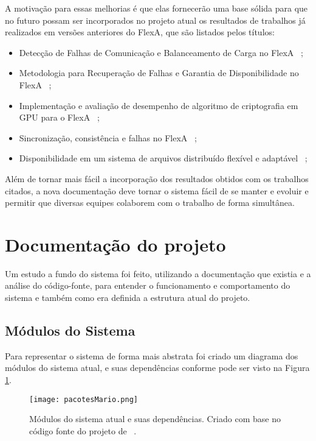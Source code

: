         A motivação para essas melhorias é que elas fornecerão uma base sólida para que no futuro possam ser incorporados no projeto atual os resultados de trabalhos já realizados em versões anteriores do FlexA, que são listados pelos títulos:
        
        \begin{itemize}
            \item Detecção de Falhas de Comunicação e Balanceamento de Carga no FlexA ~\cite{danilo};
            \item Metodologia para Recuperação de Falhas e Garantia de Disponibilidade no FlexA ~\cite{thiago};
            \item Implementação e avaliação de desempenho de algoritmo de criptografia em GPU para o FlexA ~\cite{leandro};
            \item Sincronização, consistência e falhas no FlexA ~\cite{matheus};
            \item Disponibilidade em um sistema de arquivos distribuído flexível e adaptável ~\cite{lucio};
        \end{itemize}
        
       
    Além de tornar mais fácil a incorporação dos resultados obtidos com os trabalhos citados, a nova documentação deve tornar o sistema fácil de se manter e evoluir e permitir que diversas equipes colaborem com o trabalho de forma simultânea.
    
    
        
    \section{Documentação do projeto}
        
    Um estudo a fundo do sistema foi feito, utilizando a documentação que existia e a análise do código-fonte, para entender o funcionamento e comportamento do sistema e também como era definida a estrutura atual do projeto. 
    
    \subsection{Módulos do Sistema}
    
        Para representar o sistema de forma mais abstrata foi criado um diagrama dos módulos do sistema atual, e suas dependências conforme pode ser visto na Figura \ref{fig:pacotesMario}.
        
        \begin{figure}[!ht]
            \centering
            \texttt{[image: pacotesMario.png]}
            \caption{Módulos do sistema atual e suas dependências. Criado com base no código fonte do projeto de ~.}
            \label{fig:pacotesMario}
        \end{figure}
        
